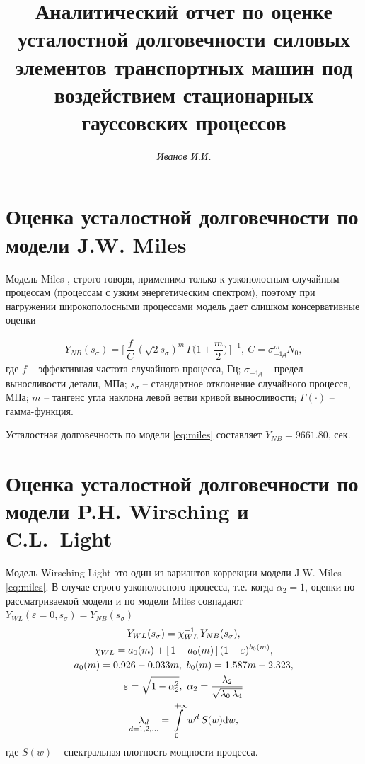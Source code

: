 \documentclass[
    11pt,
    a4paper,
    utf8,
]{article}
\begin{document}
\title{ Аналитический отчет по оценке усталостной долговечности силовых элементов транспортных машин под воздействием стационарных гауссовских процессов } %
\author{\itshape Иванов И.И. } %
\date{}
\maketitle

\thispagestyle{fancy} %


\section{Оценка усталостной долговечности по модели J.W. Miles}

Модель Miles \cite{miles-1954}, строго говоря, применима только к узкополосным случайным процессам (процессам с узким энергетическим спектром), поэтому при нагружении широкополосными процессами модель дает слишком консервативные оценки

\begin{align}\label{eq:miles}
	Y_{NB}(s_{\sigma}) = \Big[ \, \dfrac{f}{C} \, ( \sqrt{2} s_{\sigma} )^m \, \Gamma \bigg( 1 + \dfrac{m}{2} \bigg) \, \Big]^{-1}, \ C = \sigma_{-1\text{д}}^m N_0,
\end{align}
где $ f $ -- эффективная частота случайного процесса, Гц; $ \sigma_{-1\text{д}} $ -- предел выносливости детали, МПа; $ s_{\sigma} $ -- стандартное отклонение случайного процесса, МПа; $ m $ -- тангенс угла наклона левой ветви кривой выносливости; $ \Gamma(\cdot) $ -- гамма-функция.

Усталостная долговечность по модели \eqref{eq:miles} составляет $ Y_{NB} = 9661.80 $, сек.

\section{Оценка усталостной долговечности по модели P.H. Wirsching и C.L.~Light}

Модель Wirsching-Light \cite{wirshing-light-1980} это один из вариантов коррекции модели J.W. Miles \eqref{eq:miles}. В случае строго узкополосного процесса, т.е. когда $ \alpha_2 = 1 $, оценки по рассматриваемой модели и по модели Miles совпадают $ Y_{WL}(\varepsilon = 0 ,s_{\sigma}) = Y_{NB}(s_{\sigma})$
\begin{gather}\label{eq:wirsching-light}
	Y_{WL}(s_{\sigma}) = \chi_{WL}^{-1} \, Y_{NB}(s_\sigma), \\
	\chi_{WL} = a_0(m) + [\, 1 - a_0(m) \,]\, (1 - \varepsilon)^{ b_0(m) }, \notag \\
	a_0(m) = 0.926 - 0.033 m, \ b_0(m) = 1.587 m - 2.323, \notag \\
	\varepsilon = \sqrt{1 - \alpha_2^2}, \ \alpha_2 = \dfrac{ \lambda_2 }{ \sqrt{ \lambda_0\, \lambda_4} } \notag \\
	\underset{d = 1, 2, \ldots}{\lambda_d} = \int\limits_{0}^{+\infty} w^d\, S(w) \mathrm{d}w, \notag
\end{gather}
где $ S(w) $ -- спектральная плотность мощности процесса.
\end{document}
